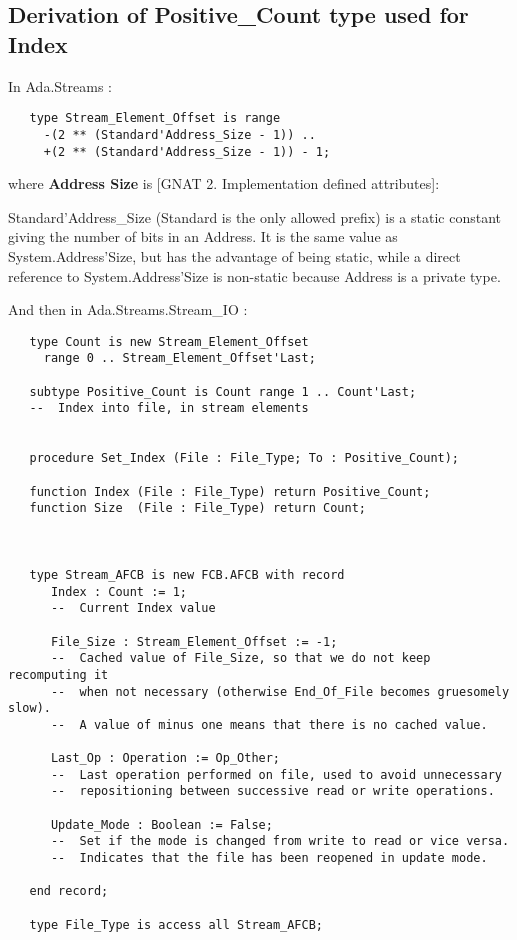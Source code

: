 \documentclass[a4paper,10pt]{article}
\begin{document}
\subsection{Derivation of Positive\_Count type used for Index}

In Ada.Streams :

\begin{verbatim}
   type Stream_Element_Offset is range
     -(2 ** (Standard'Address_Size - 1)) ..
     +(2 ** (Standard'Address_Size - 1)) - 1;
\end{verbatim}

where \textbf{Address Size} is [GNAT 2. Implementation defined attributes]:

Standard'Address\_Size (Standard is the only allowed prefix) is a static constant giving
the number of bits in an Address. It is the same value as System.Address'Size, but has
the advantage of being static, while a direct reference to System.Address’Size is non-static
because Address is a private type.


And then in Ada.Streams.Stream\_IO :

\begin{verbatim}
   type Count is new Stream_Element_Offset
     range 0 .. Stream_Element_Offset'Last;

   subtype Positive_Count is Count range 1 .. Count'Last;
   --  Index into file, in stream elements


   procedure Set_Index (File : File_Type; To : Positive_Count);

   function Index (File : File_Type) return Positive_Count;
   function Size  (File : File_Type) return Count;



   type Stream_AFCB is new FCB.AFCB with record
      Index : Count := 1;
      --  Current Index value

      File_Size : Stream_Element_Offset := -1;
      --  Cached value of File_Size, so that we do not keep recomputing it
      --  when not necessary (otherwise End_Of_File becomes gruesomely slow).
      --  A value of minus one means that there is no cached value.

      Last_Op : Operation := Op_Other;
      --  Last operation performed on file, used to avoid unnecessary
      --  repositioning between successive read or write operations.

      Update_Mode : Boolean := False;
      --  Set if the mode is changed from write to read or vice versa.
      --  Indicates that the file has been reopened in update mode.

   end record;

   type File_Type is access all Stream_AFCB;

\end{verbatim}
\end{document}
